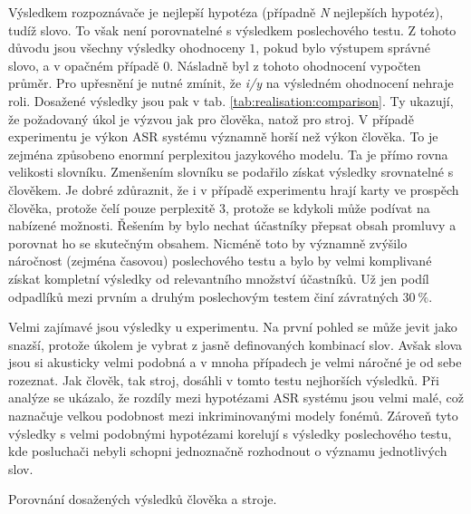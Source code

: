 Výsledkem rozpoznávače je nejlepší hypotéza (případně \textit{N} nejlepších hypotéz), tudíž slovo. To však není porovnatelné s výsledkem poslechového testu. Z tohoto důvodu jsou všechny výsledky ohodnoceny $1$, pokud bylo výstupem správné slovo, a v opačném případě $0$. Násladně byl z tohoto ohodnocení vypočten průměr. Pro upřesnění je nutné zmínit, že \textit{i/y} na výsledném ohodnocení nehraje roli. Dosažené výsledky jsou pak v tab. \ref{tab:realisation:comparison}. Ty ukazují, že požadovaný úkol je výzvou jak pro člověka, natož pro stroj. V případě experimentu  je výkon ASR systému významně horší než výkon člověka. To je zejména způsobeno enormní perplexitou jazykového modelu. Ta je přímo rovna velikosti slovníku. Zmenšením slovníku se podařilo získat výsledky srovnatelné s člověkem. Je dobré zdůraznit, že i v případě  experimentu hrají karty ve prospěch člověka, protože čelí pouze perplexitě $3$, protože se kdykoli může podívat na nabízené možnosti. Řešením by bylo nechat účastníky přepsat obsah promluvy a porovnat ho se skutečným obsahem. Nicméně toto by významně zvýšilo náročnost (zejména časovou) poslechového testu a bylo by velmi komplivané získat kompletní výsledky od relevantního množství účastníků. Už jen podíl odpadlíků mezi prvním a druhým poslechovým testem činí závratných $30\ \%$.

Velmi zajímavé jsou výsledky u  experimentu. Na první pohled se může jevit jako snazší, protože úkolem je vybrat z jasně definovaných kombinací slov. Avšak slova jsou si akusticky velmi podobná a v mnoha případech je velmi náročné je od sebe rozeznat. Jak člověk, tak stroj, dosáhli v tomto testu nejhorších výsledků. Při analýze se ukázalo, že rozdíly mezi hypotézami ASR systému jsou velmi malé, což naznačuje velkou podobnost mezi inkriminovanými modely fonémů. Zároveň tyto výsledky s velmi podobnými hypotézami korelují s výsledky poslechového testu, kde posluchači nebyli schopni jednoznačně rozhodnout o významu jednotlivých slov.

\begin{table}[htpb]
  \centering
  \def\arraystretch{1.5}
  \caption{Porovnání dosažených výsledků člověka a stroje.}
  \label{tab:realisation:comparison}
\end{table}


